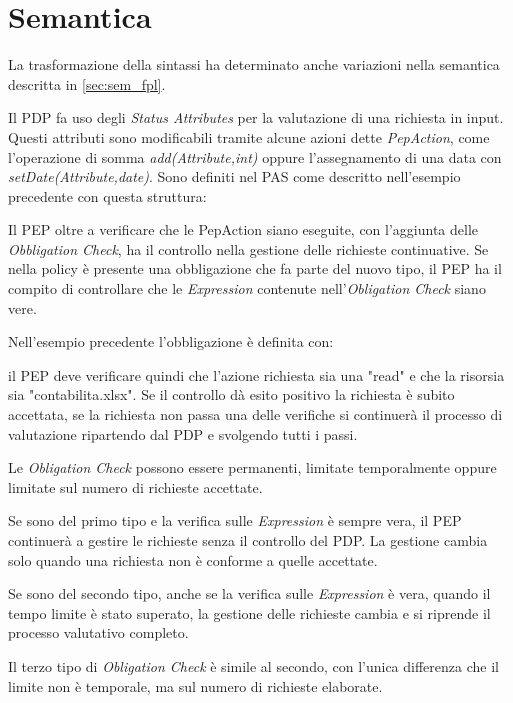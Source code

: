 \section{Semantica}
\label{sub:Semantica_Ext}
La trasformazione della sintassi ha determinato anche variazioni nella semantica descritta in \ref{sec:sem_fpl}.\par
Il \ac{PDP} fa uso degli \emph{Status Attributes} per la valutazione di una richiesta in input.
Questi attributi sono modificabili tramite alcune azioni dette \emph{PepAction}, come l'operazione di somma \emph{add(Attribute,int)}
oppure l'assegnamento di una data con \emph{setDate(Attribute,date)}.
Sono definiti nel \ac{PAS} come descritto nell'esempio precedente con questa struttura:

\par Il \ac{PEP} oltre a verificare che le PepAction siano eseguite, con l'aggiunta delle \emph{Obbligation Check}, ha il
controllo nella gestione delle richieste continuative. Se nella policy è presente una obbligazione che fa parte del nuovo tipo,
il \ac{PEP} ha il compito di controllare che le \emph{Expression} contenute nell'\emph{Obligation Check} siano vere.\par
Nell'esempio precedente l'obbligazione è definita con:

il \ac{PEP} deve verificare quindi che l'azione richiesta sia una "read" e che la risorsia sia "contabilita.xlsx".
Se il controllo dà esito positivo la richiesta è subito accettata, se la richiesta non passa una delle verifiche si continuerà
il processo di valutazione ripartendo dal \ac{PDP} e svolgendo tutti i passi.\par
Le \emph{Obligation Check} possono essere permanenti, limitate temporalmente oppure limitate sul numero di richieste
accettate.\par
\begin{description}[labelindent=5pt,style=multiline,leftmargin=3.5cm]
  \item[Permanenti]Se sono del primo tipo e la verifica sulle \emph{Expression} è sempre vera, il \ac{PEP} continuerà a gestire le
  richieste senza il controllo del \ac{PDP}. La gestione cambia solo quando una richiesta non è conforme a quelle accettate.\par
  \item[Scadenza sul tempo]Se sono del secondo tipo, anche se la verifica sulle \emph{Expression} è vera, quando il tempo limite è stato superato,
  la gestione delle richieste cambia e si riprende il processo valutativo completo.
  \item[Scadenza sul numero di richieste]Il terzo tipo di \emph{Obligation Check} è simile al secondo, con l'unica differenza che il limite non è temporale,
  ma sul numero di richieste elaborate.
\end{description}

